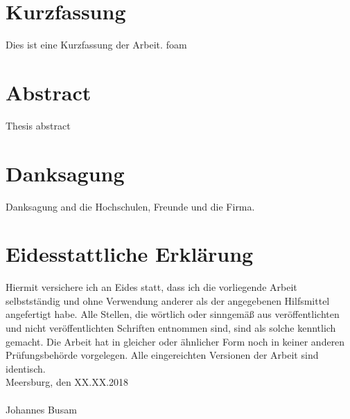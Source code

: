 %
\section*{Kurzfassung}
Dies ist eine Kurzfassung der Arbeit.
\gls{foam}\\

\newpage
\section*{Abstract}
Thesis abstract
\newpage

\section*{Danksagung}
Danksagung and die Hochschulen, Freunde und die Firma.
\newpage

\section*{Eidesstattliche Erklärung}

Hiermit versichere ich an Eides statt, dass ich die vorliegende Arbeit selbstständig und
ohne Verwendung anderer als der angegebenen Hilfsmittel angefertigt habe. Alle Stellen,
die wörtlich oder sinngemäß aus veröffentlichten und nicht veröffentlichten Schriften
entnommen sind, sind als solche kenntlich gemacht. Die Arbeit hat in gleicher oder
ähnlicher Form noch in keiner anderen Prüfungsbehörde vorgelegen. Alle eingereichten
Versionen der Arbeit sind identisch.\\
\newline
\noindent
Meersburg, den XX.XX.2018 \\
\vspace{1.5cm} \\
Johannes Busam\newline

\newpage
